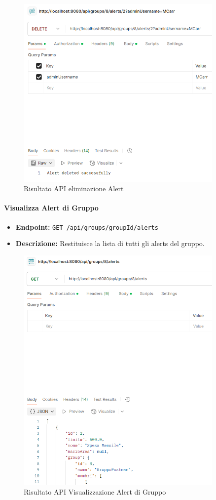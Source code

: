 \begin{figure}[H]
    \centering
    \includegraphics[width=0.9\textwidth]{images/DeleteAlert.png}
    \caption{Risultato API eliminazione Alert}
    \label{fig:api_deleteAlert}
\end{figure}

\paragraph{Visualizza Alert di Gruppo}

\begin{itemize}
    \item \textbf{Endpoint:} \texttt{GET /api/groups/{groupId}/alerts}
    \item \textbf{Descrizione:} Restituisce la lista di tutti gli alerts del gruppo.
\end{itemize}

\begin{figure}[H]
    \centering
    \includegraphics[width=0.9\textwidth]{images/GetAlertsForGroup.png}  
    \caption{Risultato API Visualizzazione Alert di Gruppo}
    \label{fig:api_view_group_alerts}  
\end{figure}
